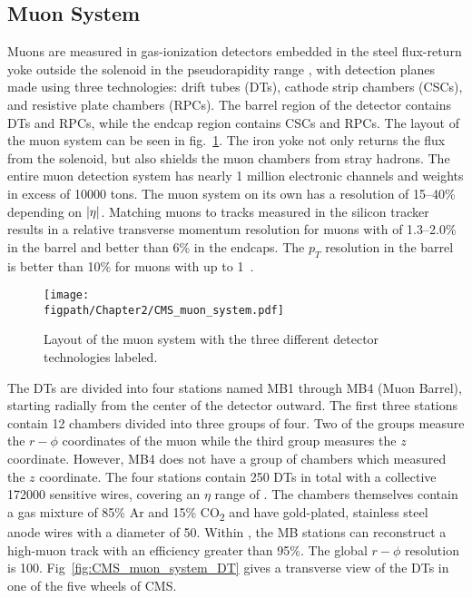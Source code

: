 \subsection{Muon System}

Muons are measured in gas-ionization detectors embedded in the steel flux-return yoke outside the solenoid in the pseudorapidity range , with detection planes made using three technologies: drift tubes (DTs), cathode strip chambers (CSCs), and resistive plate chambers (RPCs).
The barrel region of the detector contains DTs and RPCs, while the endcap region contains CSCs and RPCs.
The layout of the muon system can be seen in fig.~\ref{fig:CMS_muon_system}.
The iron yoke not only returns the flux from the solenoid, but also shields the muon chambers from stray hadrons.
The entire muon detection system has nearly 1 million electronic channels and weights in excess of 10000 tons.
The muon system on its own has a resolution of 15--40\% depending on $\lvert \eta \rvert$.
Matching muons to tracks measured in the silicon tracker results in a relative transverse momentum resolution for muons with \GeV of 1.3--2.0\% in the barrel and better than 6\% in the endcaps. The $p_{T}$ resolution in the barrel is better than 10\% for muons with \pt up to 1\TeV~\cite{Chatrchyan:2012xi}.

\begin{figure}[!hbt]
	\centering
	\texttt{[image: \\figpath/Chapter2/CMS\_muon\_system.pdf]}
	\caption{Layout of the muon system with the three different detector technologies labeled.}
	\label{fig:CMS_muon_system}
\end{figure}

The DTs are divided into four stations named MB1 through MB4 (Muon Barrel), starting radially from the center of the detector outward.
The first three stations contain 12 chambers divided into three groups of four.
Two of the groups measure the $r-\phi$ coordinates of the muon while the third group measures the $z$ coordinate.
However, MB4 does not have a group of chambers which measured the $z$ coordinate.
The four stations contain 250 DTs in total with a collective 172000 sensitive wires, covering an $\eta$ range of .
The chambers themselves contain a gas mixture of 85\% Ar and 15\% CO\textsubscript{2} and have gold-plated, stainless steel anode wires with a diameter of 50\mum.
Within , the MB stations can reconstruct a high-\pt muon track with an efficiency greater than 95\%.
The global $r-\phi$ resolution is 100\mum.
Fig~\ref{fig:CMS_muon_system_DT} gives a transverse view of the DTs in one of the five wheels of CMS.


